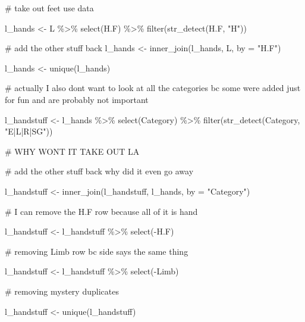 \documentclass[
  letterpaper,
  DIV=11,
  numbers=noendperiod]{scrartcl}
\newenvironment{Shaded}{\begin{snugshade}}{\end{snugshade}}
\newcommand{\AttributeTok}[1]{\textcolor[rgb]{0.40,0.45,0.13}{#1}}
\newcommand{\CommentTok}[1]{\textcolor[rgb]{0.37,0.37,0.37}{#1}}
\newcommand{\FunctionTok}[1]{\textcolor[rgb]{0.28,0.35,0.67}{#1}}
\newcommand{\NormalTok}[1]{\textcolor[rgb]{0.00,0.23,0.31}{#1}}
\newcommand{\OtherTok}[1]{\textcolor[rgb]{0.00,0.23,0.31}{#1}}
\newcommand{\SpecialCharTok}[1]{\textcolor[rgb]{0.37,0.37,0.37}{#1}}
\newcommand{\StringTok}[1]{\textcolor[rgb]{0.13,0.47,0.30}{#1}}
\begin{document}
\begin{Shaded}
\begin{Highlighting}[]
\CommentTok{\# take out feet use data}

\NormalTok{l\_hands }\OtherTok{\textless{}{-}}
\NormalTok{  L }\SpecialCharTok{\%\textgreater{}\%}
  \FunctionTok{select}\NormalTok{(H.F) }\SpecialCharTok{\%\textgreater{}\%}
  \FunctionTok{filter}\NormalTok{(}\FunctionTok{str\_detect}\NormalTok{(H.F, }\StringTok{"H"}\NormalTok{))}

\CommentTok{\# add the other stuff back}
\NormalTok{l\_hands }\OtherTok{\textless{}{-}} \FunctionTok{inner\_join}\NormalTok{(l\_hands, L, }\AttributeTok{by =} \StringTok{"H.F"}\NormalTok{)}

\NormalTok{l\_hands }\OtherTok{\textless{}{-}} \FunctionTok{unique}\NormalTok{(l\_hands)}

\CommentTok{\# actually I also don\textquotesingle{}t want to look at all the categories bc some were added just for fun and are probably not important}

\NormalTok{l\_handstuff }\OtherTok{\textless{}{-}}
\NormalTok{  l\_hands }\SpecialCharTok{\%\textgreater{}\%}
  \FunctionTok{select}\NormalTok{(Category) }\SpecialCharTok{\%\textgreater{}\%}
  \FunctionTok{filter}\NormalTok{(}\FunctionTok{str\_detect}\NormalTok{(Category, }\StringTok{"E|L|R|SG"}\NormalTok{))}


\CommentTok{\# WHY WON\textquotesingle{}T IT TAKE OUT LA}

\CommentTok{\# add the other stuff back why did it even go away}

\NormalTok{l\_handstuff }\OtherTok{\textless{}{-}} \FunctionTok{inner\_join}\NormalTok{(l\_handstuff, l\_hands, }\AttributeTok{by =} \StringTok{"Category"}\NormalTok{)}

\CommentTok{\# I can remove the H.F row because all of it is hand }

\NormalTok{l\_handstuff }\OtherTok{\textless{}{-}}\NormalTok{ l\_handstuff }\SpecialCharTok{\%\textgreater{}\%} \FunctionTok{select}\NormalTok{(}\SpecialCharTok{{-}}\NormalTok{H.F)}

\CommentTok{\# removing Limb row bc side says the same thing}

\NormalTok{l\_handstuff }\OtherTok{\textless{}{-}}\NormalTok{ l\_handstuff }\SpecialCharTok{\%\textgreater{}\%} \FunctionTok{select}\NormalTok{(}\SpecialCharTok{{-}}\NormalTok{Limb)}

\CommentTok{\# removing mystery duplicates}

\NormalTok{l\_handstuff }\OtherTok{\textless{}{-}} \FunctionTok{unique}\NormalTok{(l\_handstuff)}



\end{Highlighting}
\end{Shaded}
\end{document}

